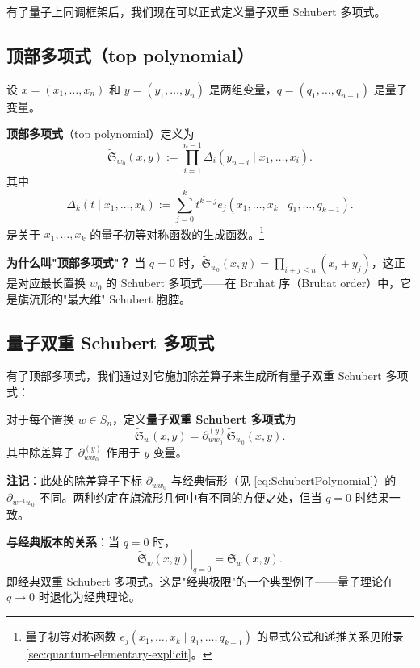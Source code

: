 有了量子上同调框架后，我们现在可以正式定义量子双重 Schubert 多项式。

\subsection{顶部多项式（top polynomial）}

设 $x = (x_1, \ldots, x_n)$ 和 $y = (y_1, \ldots, y_n)$ 是两组变量，$q = (q_1, \ldots, q_{n-1})$ 是量子变量。

\textbf{顶部多项式}（top polynomial）定义为
\[
\widetilde{\mathfrak{S}}_{w_0}(x,y) := \prod_{i=1}^{n-1} \Delta_i(y_{n-i} \mid x_1, \ldots, x_i).
\label{eq:TopPolynomial}
\]
其中
\[
\Delta_k(t \mid x_1, \ldots, x_k) := \sum_{j=0}^k t^{k-j} e_j(x_1, \ldots, x_k \mid q_1, \ldots, q_{k-1}).
\label{eq:DeltaFunction}
\]
是关于 $x_1, \ldots, x_k$ 的量子初等对称函数的生成函数。\footnote{量子初等对称函数 $e_j(x_1, \ldots, x_k \mid q_1, \ldots, q_{k-1})$ 的显式公式和递推关系见附录 \cref{sec:quantum-elementary-explicit}。}

\textbf{为什么叫"顶部多项式"？} 当 $q=0$ 时，$\widetilde{\mathfrak{S}}_{w_0}(x,y) = \prod_{i+j\leq n}(x_i+y_j)$，这正是对应最长置换 $w_0$ 的 Schubert 多项式——在 Bruhat 序（Bruhat order）中，它是旗流形的"最大维" Schubert 胞腔。

\subsection{量子双重 Schubert 多项式}

有了顶部多项式，我们通过对它施加除差算子来生成所有量子双重 Schubert 多项式：

\begin{Definition}
\label{def:QuantumDoubleSchubert}
对于每个置换 $w \in S_n$，定义\textbf{量子双重 Schubert 多项式}为
\[
\widetilde{\mathfrak{S}}_w(x,y) = \partial_{ww_0}^{(y)} \widetilde{\mathfrak{S}}_{w_0}(x,y).
\label{eq:QuantumDoubleSchubertDef}
\]
其中除差算子 $\partial_{ww_0}^{(y)}$ 作用于 $y$ 变量。
\end{Definition}

\textbf{注记}：此处的除差算子下标 $\partial_{ww_0}$ 与经典情形（见 \eqref{eq:SchubertPolynomial}）的 $\partial_{w^{-1}w_0}$ 不同。两种约定在旗流形几何中有不同的方便之处，但当 $q=0$ 时结果一致。

\textbf{与经典版本的关系}：当 $q = 0$ 时，
\[
\left. \widetilde{\mathfrak{S}}_w(x,y) \right|_{q=0} = \mathfrak{S}_w(x,y).
\label{eq:ClassicalLimit}
\]
即经典双重 Schubert 多项式。这是"经典极限"的一个典型例子——量子理论在 $q \to 0$ 时退化为经典理论。

